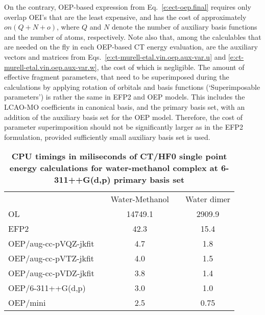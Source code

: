 %
On the contrary, 
OEP\hyp{}based expression
from Eq.~\eqref{e:ect-oep.final} requires only overlap OEI's that are the least expensive, 
and has the cost of approximately $on(Q+N+o)$, where 
$Q$ and $N$ denote the number of auxiliary basis functions and the number of atoms,
respectively. Note also that, among the calculables that are needed on the fly in each
OEP\hyp{}based CT energy evaluation, are the auxiliary vectors and matrices 
from Eqs.~\eqref{e:ct-murell-etal.vin.oep.aux-var.u}
and \eqref{e:ct-murell-etal.vin.oep.aux-var.w},
the cost of which is negligible. The amount of effective fragment parameters,
that need to be superimposed during the calculations by applying rotation
of orbitals and basis functions (`Superimposable parameters')
is rather the same in EFP2 and OEP models. 
This includes the LCAO\hyp{}MO coefficients in canonical basis,
and the primary basis set, with an addition of the auxiliary basis set
for the OEP model. Therefore, the cost of parameter superimposition should
not be significantly larger as in the EFP2 formulation, provided sufficiently 
small auxiliary basis set is used.
{
\renewcommand{\arraystretch}{1.4}
\begin{table}[h]
\caption[Minimal auxiliary basis set optimized for OEP\hyp{}based CT/HF0 calculations.]
{{\bf CPU timings in miliseconds of CT/HF0 single point energy calculations
for water-methanol complex at 6-311++G(d,p) primary basis set\footnotemark[1]}
}
\label{t:5}
\begin{ruledtabular}
\begin{tabular}{llccc}
                      && Water-Methanol && Water dimer \\
\cline{3-5}
OL                    &&14749.1 &&  2909.9\\     %
EFP2                  &&  42.3  &&    15.4\\
OEP/aug-cc-pVQZ-jkfit &&   4.7  &&     1.8\\
OEP/aug-cc-pVTZ-jkfit &&   4.0  &&     1.5\\
OEP/aug-cc-pVDZ-jkfit &&   3.8  &&     1.4\\
OEP/6-311++G(d,p)     &&   3.0  &&     1.0\\
OEP/mini              &&   2.5  &&     0.75\\
\end{tabular}
\end{ruledtabular}
%
%
\end{table}
}
%

